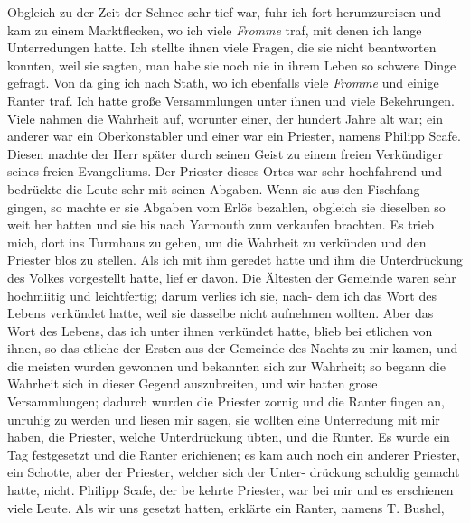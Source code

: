 Obgleich zu der Zeit der Schnee sehr tief war, fuhr ich fort
herumzureisen und kam zu einem Marktflecken, wo ich viele
\textit{Fromme} traf, mit denen ich lange Unterredungen hatte. Ich
stellte ihnen viele Fragen, die sie nicht beantworten konnten, weil
sie sagten, man habe sie noch nie in ihrem Leben so schwere
Dinge gefragt. Von da ging ich nach Stath, wo ich ebenfalls
viele \textit{Fromme} und einige Ranter traf. 
Ich hatte große Versammlungen unter ihnen und viele Bekehrungen. 
Viele nahmen die Wahrheit auf, worunter einer, der hundert 
Jahre alt war; ein
anderer war ein Oberkonstabler und einer war ein Priester, namens
Philipp Scafe. Diesen machte der Herr 
später durch seinen Geist
zu einem freien Verkündiger seines freien Evangeliums.
Der Priester dieses Ortes war sehr hochfahrend und bedrückte
die Leute sehr mit seinen Abgaben. 
Wenn sie aus den Fischfang
gingen, so machte er sie Abgaben vom Erlös bezahlen, obgleich
sie dieselben so weit her hatten und sie bis nach Yarmouth zum
verkaufen brachten. Es trieb mich, dort ins Turmhaus zu gehen,
um die Wahrheit zu verkünden und den Priester blos zu stellen.
Als ich mit ihm geredet hatte und ihm die Unterdrückung des
Volkes vorgestellt hatte, lief er davon. Die Ältesten der Gemeinde
waren sehr hochmiitig und leichtfertig; darum verlies ich sie, nach-
dem ich das Wort des Lebens verkündet hatte, weil sie dasselbe
nicht aufnehmen wollten. Aber das Wort des Lebens, das ich
unter ihnen verkündet hatte, blieb bei etlichen von ihnen, so das
etliche der Ersten aus der Gemeinde des Nachts zu mir kamen,
und die meisten wurden gewonnen und bekannten sich zur Wahrheit;
so begann die Wahrheit sich in dieser Gegend auszubreiten, und
wir hatten grose Versammlungen; dadurch wurden die Priester
zornig und die Ranter fingen an, unruhig zu werden und liesen
mir sagen, sie wollten eine Unterredung mit mir haben, die Priester,
welche Unterdrückung übten, und die Runter. Es wurde ein Tag
festgesetzt und die Ranter erichienen; es kam auch noch ein anderer
Priester, ein Schotte, aber der Priester, welcher sich der Unter-
drückung schuldig gemacht hatte, nicht. Philipp Scafe, der be
kehrte Priester, war bei mir und es erschienen viele Leute. Als
wir uns gesetzt hatten, erklärte ein Ranter, namens T. Bushel,


